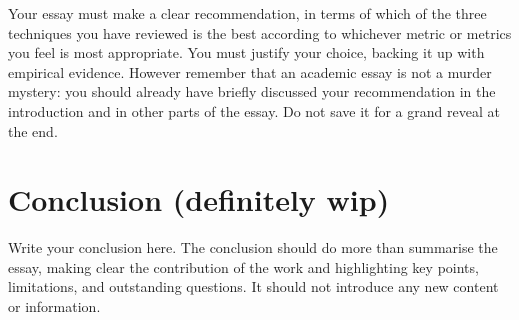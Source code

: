 \documentclass{scrartcl}
\begin{document}
Your essay must make a clear recommendation, in terms of which of the three techniques you have reviewed is the best according to whichever metric or metrics you feel is most appropriate. You must justify your choice, backing it up with empirical evidence. However remember that an academic essay is not a murder mystery: you should already have briefly discussed your recommendation in the introduction and in other parts of the essay. Do not save it for a grand reveal at the end.

\section{Conclusion (definitely wip)}

Write your conclusion here. The conclusion should do more than summarise the essay, making clear the contribution of the work and highlighting key points, limitations, and outstanding questions. It should not introduce any new content or information.



\end{document}
